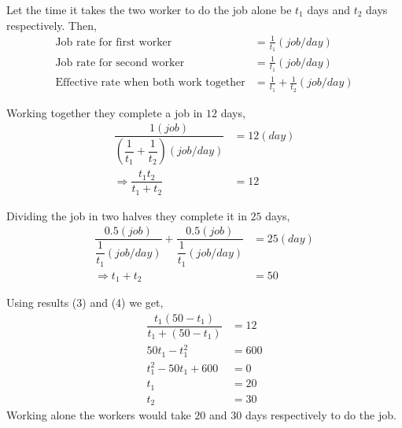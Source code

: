 \begin{solution}
  Let the time it takes the two worker to do the job alone be $t_1$ days and $t_2$ days respectively. Then,
  \begin{align}
    \text{Job rate for first worker}  &= \frac{1}{t_1}(job/day) \nonumber \\
    \text{Job rate for second worker} &= \frac{1}{t_1}(job/day) \nonumber \\
    \text{Effective rate when both work together}     
    					&= \frac{1}{t_1}+\frac{1}{t_2}(job/day)
  \end{align}
  
  Working together they complete a job in $12$ days,
  \begin{align}
	\dfrac{1(job)}
		{\left(\dfrac{1}{t_1}+\dfrac{1}{t_2}\right)(job/day)} &= 12(day) \\
	\Rightarrow \dfrac{t_1t_2}{t_1+t_2}                       &= 12
  \end{align}
  
  Dividing the job in two halves they complete it in $25$ days,
  \begin{align}
    \dfrac{0.5(job)}{\dfrac{1}{t_1}(job/day)}+
    	\dfrac{0.5(job)}{\dfrac{1}{t_1}(job/day)} &= 25(day) \\
    \Rightarrow t_1+t_2                           &= 50
  \end{align}
  
  Using results (3) and (4) we get,
  \begin{align}
	\dfrac{t_1(50-t_1)}{t_1+(50-t_1)} &= 12 \\
    50t_1-t_1^2                     &= 600 \\
    t_1^2-50t_1+600                 &= 0 \\     
    t_1                             &= 20 \\
    t_2                             &= 30
  \end{align}
  Working alone the workers would take $20$ and $30$ days respectively to do the job.

\end{solution}


